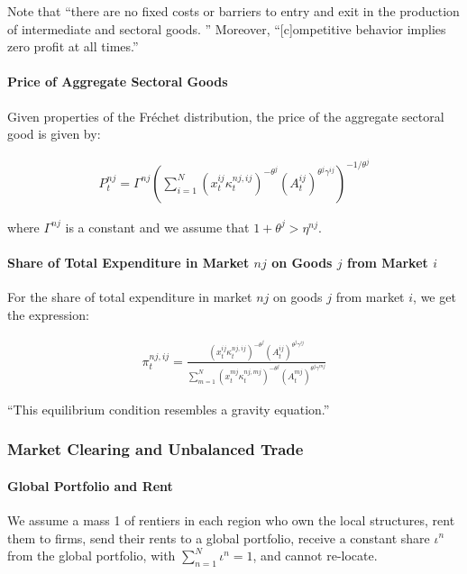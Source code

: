 \documentclass[10pt]{article}
\begin{document}
Note that 
``there are no fixed costs 
or barriers to entry and exit 
in the production of intermediate and sectoral goods. ''
Moreover, ``[c]ompetitive behavior 
implies zero profit at all times.''

\paragraph{Price of Aggregate Sectoral Goods}

Given properties of the Fréchet distribution,
the price of the aggregate sectoral good is given by:

\begin{align}
    P_t^{n j}=\Gamma^{n j}\left(\sum_{i=1}^N\left(x_t^{i j} \kappa_t^{n j, i j}\right)^{-\theta^j}\left(A_t^{i j}\right)^{\theta^j \gamma^{i j}}\right)^{-1 / \theta^j}
\end{align}

where $\Gamma^{n j}$ is a constant
and we assume that $1+\theta^j>\eta^{n j}$.

\paragraph{Share of Total Expenditure in Market $nj$ on Goods $j$ from Market $i$}

For the share of total expenditure in market $nj$ on goods $j$ from market $i$, we 
get the expression:

\begin{align}
    \pi_t^{n j, i j}=\frac{\left(x_t^{i j} \kappa_t^{n j, i j}\right)^{-\theta^j}\left(A_t^{i j}\right)^{\theta^j \gamma^{i j}}}{\sum_{m=1}^N\left(x_t^{m j} \kappa_t^{n j, m j}\right)^{-\theta^j}\left(A_t^{m j}\right)^{\theta^j \gamma^{m j}}}
\end{align}

``This equilibrium condition resembles a gravity equation.''

\subsubsection{Market Clearing and Unbalanced Trade}

\paragraph{Global Portfolio and Rent}

We assume a mass 1 of rentiers in each region who 
own the local structures, rent them to firms, send their 
rents to a global portfolio, receive a constant
share $\iota^n$ from the global portfolio, 
with $\sum_{n=1}^N \iota^n=1$,
and cannot re-locate.
\end{document}
